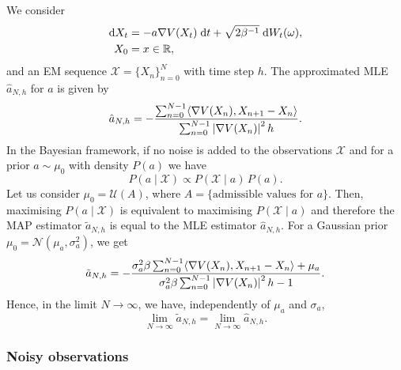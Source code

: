 \documentclass[10pt]{article}
\begin{document}
We consider
\begin{equation}\label{eq:Langevin}
\begin{aligned}
\mathrm{d} X_t &= -a \nabla V(X_t) \; \mathrm{d} t + \sqrt{2\beta^{-1}} \; \mathrm{d} W_t(\omega),\\
X_0 &= x \in \mathbb{R},
\end{aligned}
\end{equation}
and an EM sequence $\mathcal X = \{X_n\}_{n=0}^N$ with time step $h$. The approximated MLE $\hat a_{N, h}$ for $a$ is given by
\begin{equation}
\hat a_{N, h} = - \frac{\sum_{n=0}^{N-1} \langle \nabla V(X_n), X_{n+1} - X_n\rangle}{\sum_{n=0}^{N-1} \left\lvert\nabla V(X_n)\right\rvert^2 h}.
\end{equation}
In the Bayesian framework, if no noise is added to the observations $\mathcal X$ and for a prior $a \sim \mu_0$ with density $P(a)$ we have
\begin{equation}
P(a \mid \mathcal X) \propto P(\mathcal X \mid a) \, P(a).
\end{equation}
Let us consider $\mu_0 = \mathcal U(A)$, where $A = \{\text{admissible values for } a \}$. Then, maximising $P(a \mid \mathcal X)$ is equivalent to maximising $P(\mathcal X \mid a)$ and therefore the MAP estimator $\tilde a_{N, h}$ is equal to the MLE estimator $\hat a_{N, h}$. For a Gaussian prior $\mu_0 = \mathcal N(\mu_a, \sigma^2_a)$, we get
\begin{equation}
\tilde a_{N, h} = - \frac{ \sigma_a^2 \beta\sum_{n=0}^{N-1} \langle \nabla V(X_n), X_{n+1} - X_n\rangle + \mu_a}{\sigma_a^2 \beta \sum_{n=0}^{N-1} \left\lvert\nabla V(X_n)\right\rvert^2 h - 1}.
\end{equation}
Hence, in the limit $N \to \infty$, we have, independently of $\mu_a$ and $\sigma_a$,
\begin{equation}
\lim_{N\to \infty} \tilde a_{N, h} = \lim_{N\to \infty} \hat a_{N, h}.
\end{equation}

\subsubsection*{Noisy observations}
\end{document}
